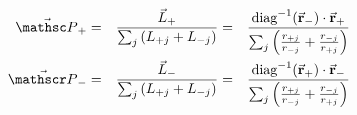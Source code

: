 
\begin{eqnarray}
\vec{\mathsc P}_+  & = & \frac{\vec{L}_+}{\sum_j\left( L_{+j} + L_{-j} \right)} & = &   \frac{\mbox{diag}^{-1}(\vec{\bf r}_-)\cdot\vec{\bf r}_+}{\sum_j\left(\frac{r_{+j}}{r_{-j}} + \frac{r_{-j}}{r_{+j}}\right)}  \\
 \vec{\mathscr P}_- & = & \frac{\vec{L}_- }{\sum_j\left( L_{+j} + L_{-j} \right)} & = &  \frac{\mbox{diag}^{-1}(\vec{\bf r}_+)\cdot\vec{\bf r}_-}{\sum_j\left(\frac{r_{+j}}{r_{-j}} + \frac{r_{-j}}{r_{+j}}\right)} \\
\end{eqnarray}
